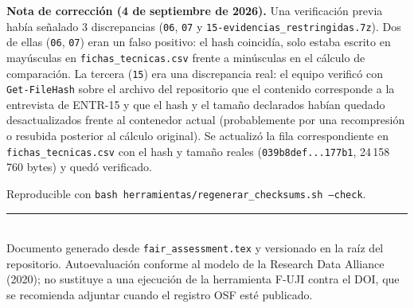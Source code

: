 \documentclass[11pt,a4paper]{article}
\begin{document}
\vspace{6pt}
\noindent\textbf{Nota de corrección (4 de septiembre de 2026).} Una
verificación previa había señalado 3 discrepancias (\texttt{06}, \texttt{07}
y \texttt{15-evidencias\_restringidas.7z}). Dos de ellas (\texttt{06},
\texttt{07}) eran un falso positivo: el hash coincidía, solo estaba escrito
en mayúsculas en \texttt{fichas\_tecnicas.csv} frente a minúsculas en el
cálculo de comparación. La tercera (\texttt{15}) era una discrepancia real:
el equipo verificó con \texttt{Get-FileHash} sobre el archivo del
repositorio que el contenido corresponde a la entrevista de ENTR-15 y que el
hash y el tamaño declarados habían quedado desactualizados frente al
contenedor actual (probablemente por una recompresión o resubida posterior
al cálculo original). Se actualizó la fila correspondiente en
\texttt{fichas\_tecnicas.csv} con el hash y tamaño reales
(\texttt{039b8def...177b1}, 24\,158\,760 bytes) y quedó verificado.

Reproducible con \texttt{bash herramientas/regenerar\_checksums.sh --check}.

\vspace{14pt}
\noindent\rule{\textwidth}{0.4pt}\\
{\footnotesize Documento generado desde \texttt{fair\_assessment.tex} y
versionado en la raíz del repositorio. Autoevaluación conforme al modelo de la
Research Data Alliance (2020); no sustituye a una ejecución de la herramienta
F-UJI contra el DOI, que se recomienda adjuntar cuando el registro OSF esté
publicado.}
\end{document}
